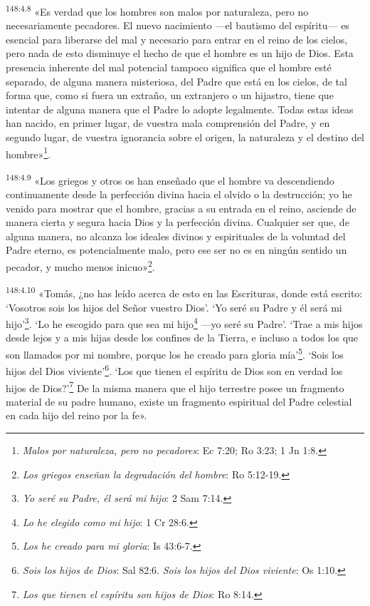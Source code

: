 \par
\textsuperscript{148:4.8} «Es verdad que los hombres son malos por naturaleza, pero no necesariamente pecadores. El nuevo nacimiento ---el bautismo del espíritu--- es esencial para liberarse del mal y necesario para entrar en el reino de los cielos, pero nada de esto disminuye el hecho de que el hombre es un hijo de Dios. Esta presencia inherente del mal potencial tampoco significa que el hombre esté separado, de alguna manera misteriosa, del Padre que está en los cielos, de tal forma que, como si fuera un extraño, un extranjero o un hijastro, tiene que intentar de alguna manera que el Padre lo adopte legalmente. Todas estas ideas han nacido, en primer lugar, de vuestra mala comprensión del Padre, y en segundo lugar, de vuestra ignorancia sobre el origen, la naturaleza y el destino del hombre»\footnote{\textit{Malos por naturaleza, pero no pecadores}: Ec 7:20; Ro 3:23; 1 Jn 1:8.}.

\par
\textsuperscript{148:4.9} «Los griegos y otros os han enseñado que el hombre va descendiendo continuamente desde la perfección divina hacia el olvido o la destrucción; yo he venido para mostrar que el hombre, gracias a su entrada en el reino, asciende de manera cierta y segura hacia Dios y la perfección divina. Cualquier ser que, de alguna manera, no alcanza los ideales divinos y espirituales de la voluntad del Padre eterno, es potencialmente malo, pero ese ser no es en ningún sentido un pecador, y mucho menos inicuo»\footnote{\textit{Los griegos enseñan la degradación del hombre}: Ro 5:12-19.}.

\par
\textsuperscript{148:4.10} «Tomás, ¿no has leído acerca de esto en las Escrituras, donde está escrito: `Vosotros sois los hijos del Señor vuestro Dios'. `Yo seré su Padre y él será mi hijo'\footnote{\textit{Yo seré su Padre, él será mi hijo}: 2 Sam 7:14.}. `Lo he escogido para que sea mi hijo\footnote{\textit{Lo he elegido como mi hijo}: 1 Cr 28:6.} ---yo seré su Padre'. `Trae a mis hijos desde lejos y a mis hijas desde los confines de la Tierra, e incluso a todos los que son llamados por mi nombre, porque los he creado para gloria mía'\footnote{\textit{Los he creado para mi gloria}: Is 43:6-7.}. `Sois los hijos del Dios viviente'\footnote{\textit{Sois los hijos de Dios}: Sal 82:6. \textit{Sois los hijos del Dios viviente}: Os 1:10.}. `Los que tienen el espíritu de Dios son en verdad los hijos de Dios?'\footnote{\textit{Los que tienen el espíritu son hijos de Dios}: Ro 8:14.} De la misma manera que el hijo terrestre posee un fragmento material de su padre humano, existe un fragmento espiritual del Padre celestial en cada hijo del reino por la fe».

